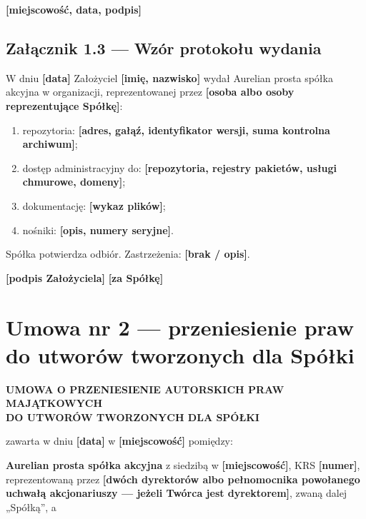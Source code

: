 \documentclass[12pt,a4paper]{report}
\newcounter{paragraf}
\newcommand{\field}[1]{\textbf{[#1]}}
\newcommand{\CompanyFull}{Aurelian prosta spółka akcyjna}
\begin{document}
\field{miejscowość, data, podpis}

\section*{Załącznik 1.3 --- Wzór protokołu wydania}

W dniu \field{data} Założyciel \field{imię, nazwisko} wydał \CompanyFull{} w organizacji, reprezentowanej przez \field{osoba albo osoby reprezentujące Spółkę}:

\begin{enumerate}
  \item repozytoria: \field{adres, gałąź, identyfikator wersji, suma kontrolna archiwum};
  \item dostęp administracyjny do: \field{repozytoria, rejestry pakietów, usługi chmurowe, domeny};
  \item dokumentację: \field{wykaz plików};
  \item nośniki: \field{opis, numery seryjne}.
\end{enumerate}

Spółka potwierdza odbiór. Zastrzeżenia: \field{brak / opis}.

\field{podpis Założyciela} \hfill \field{za Spółkę}

\chapter*{Umowa nr 2 --- przeniesienie praw do utworów tworzonych dla Spółki}
\setcounter{paragraf}{0}

\begin{center}
{\Large\bfseries UMOWA O PRZENIESIENIE AUTORSKICH PRAW MAJĄTKOWYCH\\ DO UTWORÓW TWORZONYCH DLA SPÓŁKI}\par
\vspace{0.4cm}
\end{center}

zawarta w dniu \field{data} w \field{miejscowość} pomiędzy:

\textbf{\CompanyFull} z siedzibą w \field{miejscowość}, KRS \field{numer}, reprezentowaną przez \field{dwóch dyrektorów albo pełnomocnika powołanego uchwałą akcjonariuszy --- jeżeli Twórca jest dyrektorem}, zwaną dalej „Spółką”, a
\end{document}
